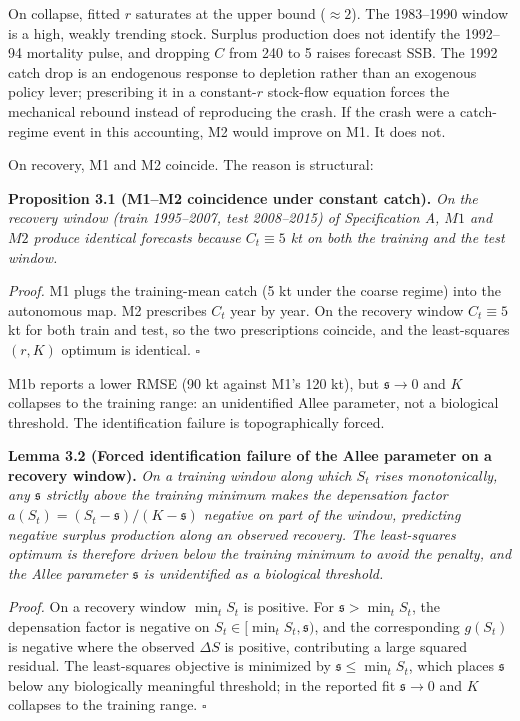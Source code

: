\documentclass[11pt]{article}
\begin{document}
On collapse, fitted \(r\) saturates at the upper bound (\(\approx 2\)).
The 1983--1990 window is a high, weakly trending stock. Surplus
production does not identify the 1992--94 mortality pulse, and dropping
\(C\) from 240 to 5 raises forecast SSB. The 1992 catch drop is an
endogenous response to depletion rather than an exogenous policy lever;
prescribing it in a constant-\(r\) stock-flow equation forces the
mechanical rebound instead of reproducing the crash. If the crash were a
catch-regime event in this accounting, M2 would improve on M1. It does
not.

On recovery, M1 and M2 coincide. The reason is structural:

\textbf{Proposition 3.1 (M1--M2 coincidence under constant catch).}
\emph{On the recovery window (train 1995--2007, test 2008--2015) of
Specification A, \(M1\) and \(M2\) produce identical forecasts because
\(C_t\equiv 5\) kt on both the training and the test window.}

\emph{Proof.} M1 plugs the training-mean catch (5 kt under the coarse
regime) into the autonomous map. M2 prescribes \(C_t\) year by year. On
the recovery window \(C_t\equiv 5\) kt for both train and test, so the
two prescriptions coincide, and the least-squares \((r,K)\) optimum is
identical. \ensuremath{\square}

M1b reports a lower RMSE (90 kt against M1's 120 kt), but
\(\mathfrak s\to 0\) and \(K\) collapses to the training range: an
unidentified Allee parameter, not a biological threshold. The
identification failure is topographically forced.

\textbf{Lemma 3.2 (Forced identification failure of the Allee parameter
on a recovery window).} \emph{On a training window along which \(S_t\)
rises monotonically, any \(\mathfrak s\) strictly above the training
minimum makes the depensation factor
\(a(S_t)=(S_t-\mathfrak s)/(K-\mathfrak s)\) negative on part of the
window, predicting negative surplus production along an observed
recovery. The least-squares optimum is therefore driven below the
training minimum to avoid the penalty, and the Allee parameter
\(\mathfrak s\) is unidentified as a biological threshold.}

\emph{Proof.} On a recovery window \(\min_t S_t\) is positive. For
\(\mathfrak s>\min_t S_t\), the depensation factor is negative on
\(S_t\in[\min_t S_t,\mathfrak s)\), and the corresponding \(g(S_t)\) is
negative where the observed \(\Delta S\) is positive, contributing a
large squared residual. The least-squares objective is minimized by
\(\mathfrak s\le \min_t S_t\), which places \(\mathfrak s\) below any
biologically meaningful threshold; in the reported fit
\(\mathfrak s\to 0\) and \(K\) collapses to the training range. \ensuremath{\square}
\end{document}
